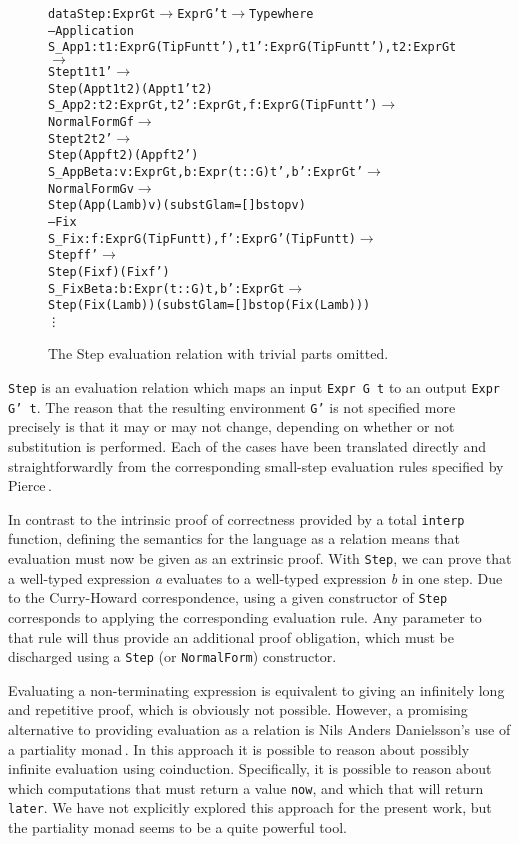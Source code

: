 \begin{figure}
\begin{alltt}
  data Step : Expr G t \(\rightarrow\) Expr G' t \(\rightarrow\) Type where
      -- Application
      S_App1    : {t1: Expr G (TipFun t t'), t1': Expr G (TipFun t t'), t2: Expr G t} \(\rightarrow\)
                  Step t1 t1' \(\rightarrow\)
                  Step (App t1 t2) (App t1' t2)
      S_App2    : {t2: Expr G t, t2': Expr G t, f: Expr G (TipFun t t')} \(\rightarrow\)
                  NormalForm G f \(\rightarrow\)
                  Step t2 t2' \(\rightarrow\)
                  Step (App f t2) (App f t2')
      S_AppBeta : {v: Expr G t, b: Expr (t :: G) t', b': Expr G t'} \(\rightarrow\)
                  NormalForm G v \(\rightarrow\)
                  Step (App (Lam b) v) (subst {Glam=[]} b stop v)
      -- Fix
      S_Fix     : {f: Expr G (TipFun t t), f': Expr G' (TipFun t t)} \(\rightarrow\)
                  Step f f' \(\rightarrow\)
                  Step (Fix f) (Fix f')
      S_FixBeta : {b: Expr (t :: G) t, b': Expr G t} \(\rightarrow\)
                  Step (Fix (Lam b)) (subst {Glam=[]} b stop (Fix (Lam b)))
      \vdots
\end{alltt}
\caption{The Step evaluation relation with trivial parts omitted.}
\label{fig:step-relation}
\end{figure}

\texttt{Step} is an evaluation relation which maps an input \texttt{Expr G t} to an output \texttt{Expr G' t}. The reason that the resulting environment \texttt{G'} is not specified more precisely is that it may or may not change, depending on whether or not substitution is performed. Each of the cases have been translated directly and straightforwardly from the corresponding small-step evaluation rules specified by Pierce\,\cite{Pierce:TypeSystems}.

In contrast to the intrinsic proof of correctness provided by a total \texttt{interp} function, defining the semantics for the language as a relation means that evaluation must now be given as an extrinsic proof. With \texttt{Step}, we can prove that a well-typed expression \textit{a} evaluates to a well-typed expression \textit{b} in one step. Due to the Curry-Howard correspondence, using a given constructor of \texttt{Step} corresponds to applying the corresponding evaluation rule. Any parameter to that rule will thus provide an additional proof obligation, which must be discharged using a \texttt{Step} (or \texttt{NormalForm}) constructor.

Evaluating a non-terminating expression is equivalent to giving an infinitely long and repetitive proof, which is obviously not possible. However, a promising alternative to providing evaluation as a relation is Nils Anders Danielsson's use of a partiality monad\,\cite{Danielsson:2012:OSU:2364527.2364546}. In this approach it is possible to reason about possibly infinite evaluation using coinduction. Specifically, it is possible to reason about which computations that must return a value \texttt{now}, and which that will return \texttt{later}. We have not explicitly explored this approach for the present work, but the partiality monad seems to be a quite powerful tool.

